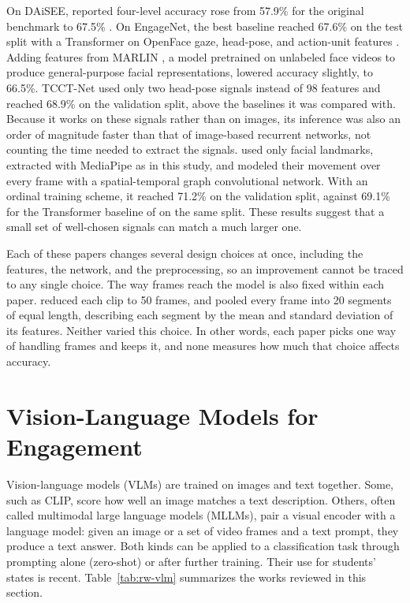 On DAiSEE, reported four-level accuracy rose from 57.9\% for the original benchmark \cite{gupta2016} to 67.5\% \cite{selim2022}. On EngageNet, the best baseline reached 67.6\% on the test split with a Transformer on OpenFace gaze, head-pose, and action-unit features \cite{singh2023}. Adding features from MARLIN \cite{cai2023marlin}, a model pretrained on unlabeled face videos to produce general-purpose facial representations, lowered accuracy slightly, to 66.5\%. TCCT-Net \cite{vedernikov2024} used only two head-pose signals instead of 98 features and reached 68.9\% on the validation split, above the baselines it was compared with. Because it works on these signals rather than on images, its inference was also an order of magnitude faster than that of image-based recurrent networks, not counting the time needed to extract the signals.  used only facial landmarks, extracted with MediaPipe as in this study, and modeled their movement over every frame with a spatial-temporal graph convolutional network. With an ordinal training scheme, it reached 71.2\% on the validation split, against 69.1\% for the Transformer baseline of  on the same split. These results suggest that a small set of well-chosen signals can match a much larger one.

Each of these papers changes several design choices at once, including the features, the network, and the preprocessing, so an improvement cannot be traced to any single choice. The way frames reach the model is also fixed within each paper.  reduced each clip to 50 frames, and  pooled every frame into 20 segments of equal length, describing each segment by the mean and standard deviation of its features. Neither varied this choice. In other words, each paper picks one way of handling frames and keeps it, and none measures how much that choice affects accuracy.



\section{Vision-Language Models for Engagement}
\label{sec:rw-vlm}

Vision-language models (VLMs) are trained on images and text together. Some, such as CLIP, score how well an image matches a text description. Others, often called multimodal large language models (MLLMs), pair a visual encoder with a language model: given an image or a set of video frames and a text prompt, they produce a text answer. Both kinds can be applied to a classification task through prompting alone (zero-shot) or after further training. Their use for students' states is recent. Table~\ref{tab:rw-vlm} summarizes the works reviewed in this section.

